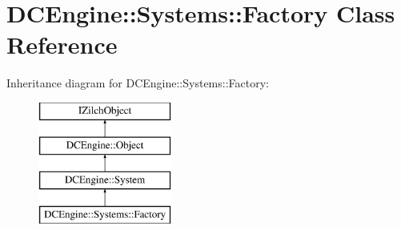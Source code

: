 \hypertarget{classDCEngine_1_1Systems_1_1Factory}{\section{D\-C\-Engine\-:\-:Systems\-:\-:Factory Class Reference}
\label{classDCEngine_1_1Systems_1_1Factory}
}
Inheritance diagram for D\-C\-Engine\-:\-:Systems\-:\-:Factory\-:\begin{figure}[H]
\begin{center}
\leavevmode
\includegraphics[height=4.000000cm]{classDCEngine_1_1Systems_1_1Factory}
\end{center}
\end{figure}

